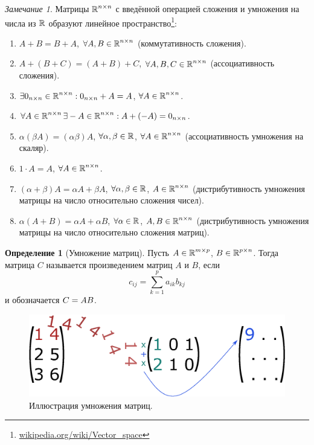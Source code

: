\documentclass[a4paper,12pt]{article}
\theoremstyle{definition}
\newtheorem{definition}{Определение}[section]
\theoremstyle{remark}
\theoremstyle{remark}
\newtheorem*{remark}{Замечание}
\begin{document}
  \begin{remark}
    Матрицы $\operatorname{\mathbb R}^{n \times n}$ с введённой операцией сложения и умножения на числа из $\operatorname{\mathbb R}$ образуют линейное пространство\footnote{\href{https://en.wikipedia.org/wiki/Vector\_space}{wikipedia.org/wiki/Vector\_space}}:
    \begin{enumerate}
      \item $A + B = B + A$, $\forall A, B \in \operatorname{\mathbb R}^{n \times n}$ (коммутативность сложения).
      \item $A + (B + C) = (A + B) + C$, $\forall A, B, C \in \operatorname{\mathbb R}^{n \times n}$ (ассоциативность сложения).
      \item $\exists 0_{n\times n} \in \operatorname{\mathbb R}^{n \times n}: 0_{n\times n} + A = A$, $\forall A \hm\in \RR^{n \times n}$.
      \item $\forall A \in \operatorname{\mathbb R}^{n \times n} \exists -A \in \operatorname{\mathbb R}^{n \times n}: A + (-A) = 0_{n\times n}$.
      \item $\alpha (\beta A) = (\alpha \beta) A$, $\forall \alpha, \beta \in \operatorname{\mathbb R}$, $\forall A \hm\in \RR^{n \times n}$ (ассоциативность умножения на скаляр).
      \item $1 \cdot A = A$, $\forall A \in \operatorname{\mathbb R}^{n \times n}$.
      \item $(\alpha + \beta) A = \alpha A + \beta A$, $\forall \alpha, \beta \hm\in \RR$, $A \hm\in \RR^{n \times n}$ (дистрибутивность умножения матрицы на число относительно сложения чисел).
      \item $\alpha (A + B) = \alpha A + \alpha B$, $\forall \alpha \hm\in \RR$, $A, B \hm\in \RR^{n \times n}$ (дистрибутивность умножения матрицы на число относительно сложения матриц).
    \end{enumerate}
  \end{remark}
  
  \begin{definition}[Умножение матриц]
    Пусть $A \hm\in \RR^{m \times p}$, $B \hm\in \RR^{p \times n}$.
    Тогда матрица $C$ называется произведением матриц $A$ и $B$, если
    \[
      c_{ij} = \sum_{k = 1}^p a_{ik} b_{kj}
    \]
    и обозначается $C \hm= AB$.
  \end{definition}

  \begin{figure}[h]
    \centering
    
    \includegraphics[width=0.5\columnwidth]{matrix-multiplication}
    
    \caption{Иллюстрация умножения матриц.}
    \label{fig:matrix-multiplication}
  \end{figure}
  
\end{document}
